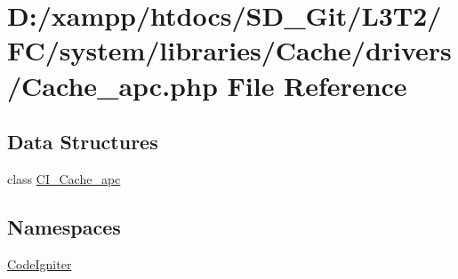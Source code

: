 \hypertarget{_cache__apc_8php}{}\section{D\+:/xampp/htdocs/\+S\+D\+\_\+\+Git/\+L3\+T2/\+F\+C/system/libraries/\+Cache/drivers/\+Cache\+\_\+apc.php File Reference}
\label{_cache__apc_8php}
\subsection*{Data Structures}
\begin{DoxyCompactItemize}
\item 
class \hyperlink{class_c_i___cache__apc}{C\+I\+\_\+\+Cache\+\_\+apc}
\end{DoxyCompactItemize}
\subsection*{Namespaces}
\begin{DoxyCompactItemize}
\item 
 \hyperlink{namespace_code_igniter}{Code\+Igniter}
\end{DoxyCompactItemize}

